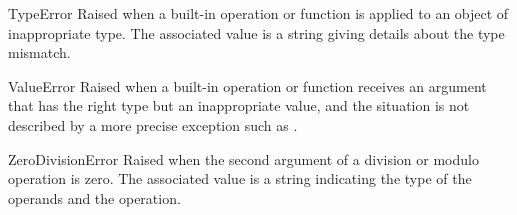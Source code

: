 \begin{excdesc}{TypeError}
  Raised when a built-in operation or function is applied to an object
  of inappropriate type.  The associated value is a string giving
  details about the type mismatch.
\end{excdesc}

\begin{excdesc}{ValueError}
  Raised when a built-in operation or function receives an argument
  that has the right type but an inappropriate value, and the
  situation is not described by a more precise exception such as
  .
\end{excdesc}

\begin{excdesc}{ZeroDivisionError}
  Raised when the second argument of a division or modulo operation is
  zero.  The associated value is a string indicating the type of the
  operands and the operation.
\end{excdesc}
